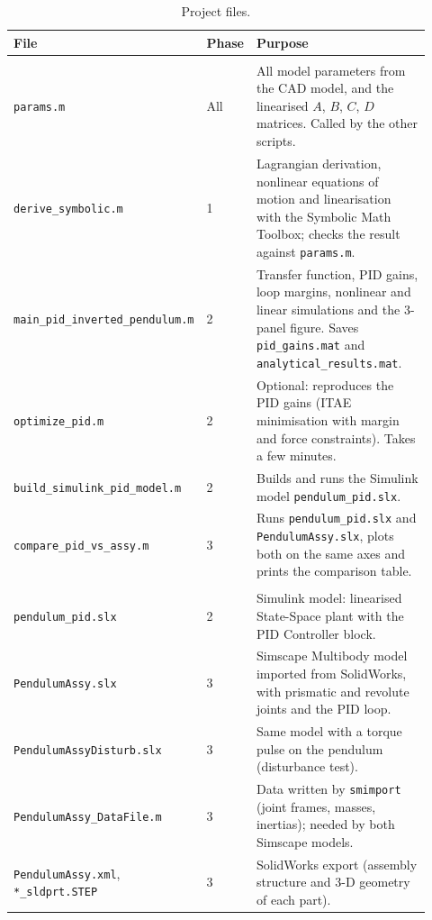 \documentclass[10pt,a4paper]{article}
\newcommand{\hdr}{\rowcolor{headgrey}}
\begin{document}
\begin{table}[H]
\centering\small
\caption{Project files.}
\begin{tabular}{|>{\raggedright}p{0.30\linewidth}|>{\raggedright}p{0.10\linewidth}|>{\raggedright\arraybackslash}p{0.52\linewidth}|}
\hline \hdr
\textbf{File} & \textbf{Phase} & \textbf{Purpose} \\ \hline
\multicolumn{3}{|l|}{\cellcolor{boxgrey}\textit{MATLAB scripts}} \\ \hline
\texttt{params.m} & All & All model parameters from the CAD model, and the linearised $A$, $B$, $C$, $D$ matrices. Called by the other scripts. \\ \hline
\texttt{derive\_symbolic.m} & 1 & Lagrangian derivation, nonlinear equations of motion and linearisation with the Symbolic Math Toolbox; checks the result against \texttt{params.m}. \\ \hline
\texttt{main\_pid\_inverted\_pendulum.m} & 2 & Transfer function, PID gains, loop margins, nonlinear and linear simulations and the 3-panel figure. Saves \texttt{pid\_gains.mat} and \texttt{analytical\_results.mat}. \\ \hline
\texttt{optimize\_pid.m} & 2 & Optional: reproduces the PID gains (ITAE minimisation with margin and force constraints). Takes a few minutes. \\ \hline
\texttt{build\_simulink\_pid\_model.m} & 2 & Builds and runs the Simulink model \texttt{pendulum\_pid.slx}. \\ \hline
\texttt{compare\_pid\_vs\_assy.m} & 3 & Runs \texttt{pendulum\_pid.slx} and \texttt{PendulumAssy.slx}, plots both on the same axes and prints the comparison table. \\ \hline
\multicolumn{3}{|l|}{\cellcolor{boxgrey}\textit{Models and data}} \\ \hline
\texttt{pendulum\_pid.slx} & 2 & Simulink model: linearised State-Space plant with the PID Controller block. \\ \hline
\texttt{PendulumAssy.slx} & 3 & Simscape Multibody model imported from SolidWorks, with prismatic and revolute joints and the PID loop. \\ \hline
\texttt{PendulumAssyDisturb.slx} & 3 & Same model with a torque pulse on the pendulum (disturbance test). \\ \hline
\texttt{PendulumAssy\_DataFile.m} & 3 & Data written by \texttt{smimport} (joint frames, masses, inertias); needed by both Simscape models. \\ \hline
\texttt{PendulumAssy.xml}, \texttt{*\_sldprt.STEP} & 3 & SolidWorks export (assembly structure and 3-D geometry of each part). \\ \hline

\end{tabular}
\end{table}
\end{document}
